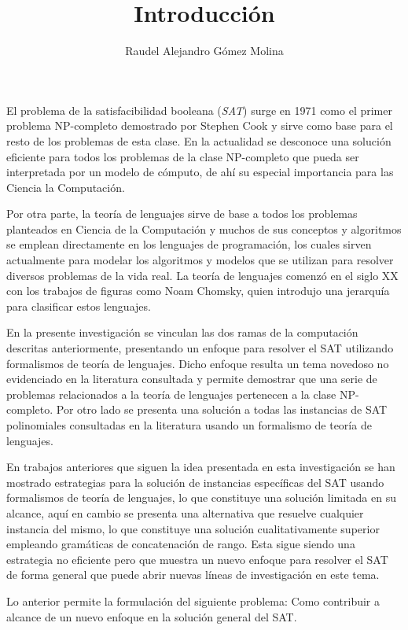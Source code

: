 \documentclass[12pt]{article}
\title{Introducción}
\author{Raudel Alejandro Gómez Molina}
\begin{document}
\maketitle

El problema de la satisfacibilidad booleana (\textit{SAT}) surge en 1971 como el primer problema NP-completo demostrado por
Stephen Cook y sirve como base para el resto de los problemas de esta clase. En la actualidad se desconoce una solución eficiente
para todos los problemas de la clase NP-completo que pueda ser interpretada por un modelo de cómputo,
de ahí su especial importancia para las Ciencia la Computación.

Por otra parte, la teoría de lenguajes sirve de base a todos los problemas planteados en Ciencia de la Computación y muchos
de sus conceptos y algoritmos se emplean directamente en los lenguajes de programación, los cuales sirven actualmente
para modelar los algoritmos y modelos que se utilizan para resolver diversos problemas de la vida real. La teoría de lenguajes comenzó
en el siglo XX con los trabajos de figuras como Noam Chomsky, quien introdujo una jerarquía para clasificar estos lenguajes.

En la presente investigación se vinculan las dos ramas de la computación descritas anteriormente, presentando un enfoque para resolver el SAT
utilizando formalismos de teoría de lenguajes. Dicho enfoque resulta un tema novedoso no evidenciado en la literatura consultada
y permite demostrar que una serie de problemas relacionados a la teoría de lenguajes pertenecen a la clase NP-completo. Por otro lado
se presenta una solución a todas las instancias de SAT polinomiales consultadas en la literatura usando un formalismo de teoría de
lenguajes.

En trabajos anteriores que siguen la idea presentada en esta investigación se han mostrado estrategias para la solución
de instancias específicas del SAT usando formalismos de teoría de lenguajes, lo que constituye una solución limitada en su alcance,
aquí en cambio se presenta una alternativa que resuelve cualquier instancia del mismo, lo que constituye una solución
cualitativamente superior empleando gramáticas de concatenación de rango. Esta sigue siendo una estrategia no eficiente pero que
muestra un nuevo enfoque para resolver el SAT de forma general que puede abrir nuevas líneas de investigación en este tema.

Lo anterior permite la formulación del siguiente problema: Como contribuir a alcance de un nuevo enfoque en la solución general del SAT.
\end{document}
